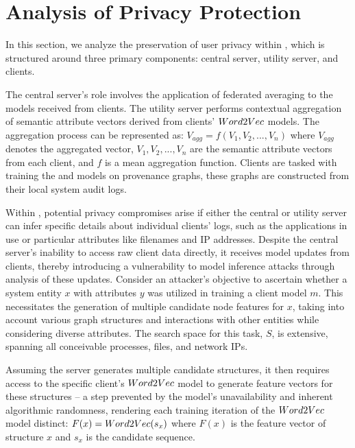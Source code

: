\section{Analysis of Privacy Protection}
\label{privacy}


In this section, we analyze the preservation of user privacy within \Sys, which is structured around three primary components: central server, utility server, and clients. 


 The central server's role involves the application of federated averaging to the \gnnshort models received from clients. The utility server performs contextual aggregation of semantic attribute vectors derived from clients' \(Word2Vec\) models. The aggregation process can be represented as: \(V_{agg} = f(V_1, V_2, ..., V_n) \)
where \(V_{agg}\) denotes the aggregated vector, \(V_1, V_2, ..., V_n\) are the semantic attribute vectors from each client, and \(f\) is a mean aggregation function. Clients are tasked with training the \wordvec and \gnnshort models on provenance graphs, these graphs are constructed from their local system audit logs.

Within \Sys, potential privacy compromises arise if either the central or utility server can infer specific details about individual clients' logs, such as the applications in use or particular attributes like filenames and IP addresses. Despite the central server's inability to access raw client data directly, it receives model updates from clients, thereby introducing a vulnerability to model inference attacks through analysis of these updates. Consider an attacker's objective to ascertain whether a system entity \(x\) with attributes \(y\) was utilized in training a client model \(m\). This necessitates the generation of multiple candidate node features for \(x\), taking into account various graph structures and interactions with other entities while considering diverse attributes. The search space for this task, \(S\), is extensive, spanning all conceivable processes, files, and network IPs.

Assuming the server generates multiple candidate structures, it then requires access to the specific client's \(Word2Vec\) model to generate feature vectors for these structures -- a step prevented by the model's unavailability and inherent algorithmic randomness, rendering each training iteration of the \(Word2Vec\) model distinct: \( F(x) = Word2Vec(s_x) \) where \(F(x)\) is the feature vector of structure \(x\) and \(s_x\) is the candidate sequence.

